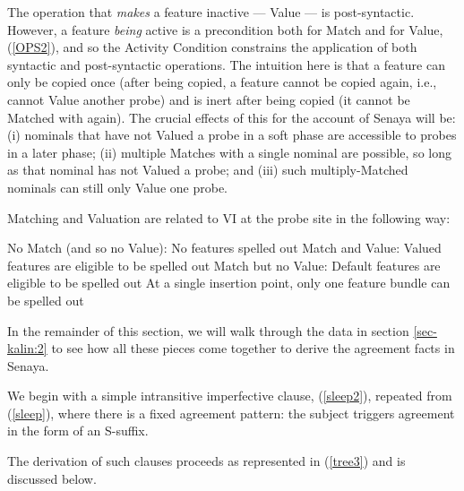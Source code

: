 \documentclass[output=paper
,modfonts
,nonflat]{langsci/langscibook}
\begin{document}
\noindent The operation that \textit{makes} a feature inactive --- Value --- is post-syntactic. However, a feature \textit{being} active is a precondition both for Match and for Value, (\ref{OPS2}), and so the Activity Condition constrains the application of both syntactic and post-syntactic operations. The intuition here is that a feature can only be copied once \citep{Bejar03} (after being copied, a feature cannot be copied again, i.e., cannot Value another probe) and is inert after being copied (it cannot be Matched with again). The crucial effects of this for the account of Senaya will be: (i) nominals that have not Valued a probe in a soft phase are accessible to probes in a later phase; (ii) multiple Matches with a single nominal are possible, so long as that nominal has not Valued a probe; and (iii) such multiply-Matched nominals can still only Value one probe.

Matching and Valuation are related to VI at the probe site in the following way: 

\eal
\ex No Match (and so no Value): No features spelled out\footnotemark
\ex Match and Value: Valued features are eligible to be spelled out
\ex Match but no Value: Default features are eligible to be spelled out
\ex At a single insertion point, only one feature bundle can be spelled out
\zl 


\noindent In the remainder of this section, we will walk through the data in section \ref{sec-kalin:2} to see how all these pieces come together to derive the agreement facts in Senaya. 

We begin with a simple intransitive imperfective clause, (\ref{sleep2}), repeated from (\ref{sleep}), where there is a fixed agreement pattern: the subject triggers agreement in the form of an S-suffix.

\z

\noindent The derivation of such clauses proceeds as represented in (\ref{tree3}) and is discussed below.
\end{document}
